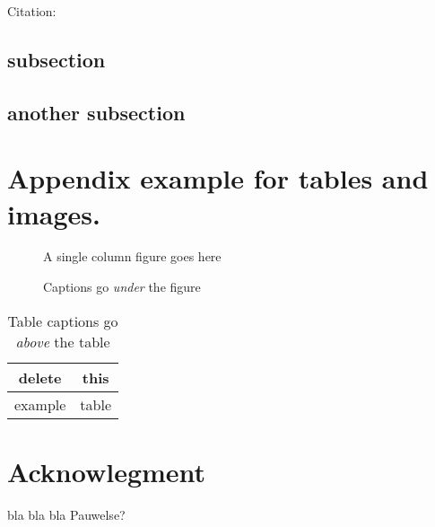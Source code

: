\documentclass[twocolumn,english,compsoc,journal]{IEEEtran}
\providecommand{\tabularnewline}{\\}
\begin{document}
Citation: \cite{example:beebe_archive}

\subsection{subsection}

\subsection{another subsection}

\section{Appendix example for tables and images.}

\begin{figure}[htbp]
\begin{centering}
\textsf{A single column figure goes here}
\par\end{centering}

\protect\caption{Captions go \emph{under} the figure}
\end{figure}
\begin{table}[htbp]
\protect\caption{Table captions go \emph{above} the table}


\centering{}%
\begin{tabular}{|c|c|}
\hline 
delete & this\tabularnewline
\hline 
\hline 
example & table\tabularnewline
\hline 
\end{tabular}
\end{table}



\section*{Acknowlegment}

bla bla bla Pauwelse?



\end{document}
